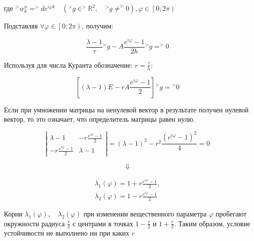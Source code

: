 \documentclass[14pt,a4paper]{scrartcl}
\begin{document}
где $^>w_k^n=^>de^{i\varphi k} \quad (^>g \in ^>\mathbb{R}^2, \quad ^>g\neq^>0), \varphi \in \left[0;2\pi\right)$

Подставляя $\forall \varphi \in \left[0;2\pi\right)$, получим:

\begin{equation*}
	\frac{\lambda-1}{\tau} {^>g} -A \frac{e^{i \varphi}-1}{2 h}{^>g}=^>0
\end{equation*}


Используя для числа Куранта обозначение: $r = \frac{\tau}{h}$:

\begin{equation*}
	\left[(\lambda-1) E-r A \frac{e^{i \varphi}-1}{2}\right] {^{>}} g={^{>}} 0
\end{equation*}

Если при умножении матрицы на ненулевой вектор в результате получен нулевой вектор, то это означает, что определитель матрицы равен нулю.

\begin{equation*}
	\left|\begin{array}{cc}
	\lambda-1 & -r \frac{e^{i \varphi}-1}{2} \\
	-r \frac{e^{i \varphi}-1}{2} & \lambda-1
	\end{array}\right|=(\lambda-1)^{2}-r^{2} \frac{\left(e^{i \varphi}-1\right)^{2}}{4}=0
\end{equation*}

\begin{equation*}
	\Downarrow
\end{equation*}

\begin{align*}
	\lambda_{1}(\varphi)=1+r \frac{e^{i \varphi}-1}{2},\\
	\lambda_{2}(\varphi)=1-r \frac{e^{i \varphi}-1}{2}
\end{align*}


Корни $\lambda_{1}(\varphi), \quad \lambda_{2}(\varphi)$ при изменении вещественного параметра $\varphi$ пробегают окружности радиуса $\frac{r}{2}$ с центрами в точках $1 - \frac{r}{2}$ и $1 + \frac{r}{2}$. Таким образом, условие устойчивости не выполнено ни при каких $r$

\begin{figure}[H]
	\begin{minipage}[h]{1\linewidth}
	\end{minipage}
\end{figure}
\end{document}
